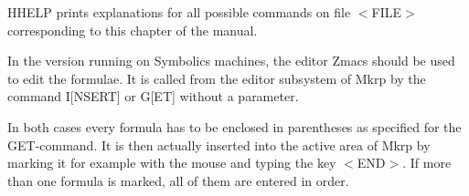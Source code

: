 %        
{HHELP prints explanations for all possible commands on file
$<$FILE$>$ corresponding to this chapter of the manual.}




In the version running on Symbolics machines, the editor Zmacs should be used to 
edit the formulae. It is called from the editor subsystem of {\sc Mkrp} by the 
command I[NSERT] or G[ET] without a parameter.

In both cases every formula has to be enclosed in parentheses as specified for the GET-command. It is then 
actually inserted into the active area of {\sc Mkrp} by marking it for example
with the mouse and typing the key $<$END$>$. If more 
than one formula is marked, all of them are entered in order.
